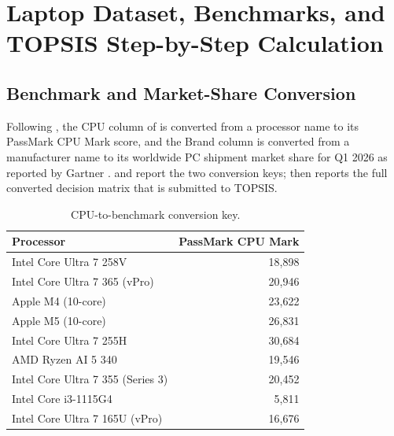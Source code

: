 \chapter{Laptop Dataset, Benchmarks, and TOPSIS Step-by-Step Calculation}\label{app:laptop-data}

\section{Benchmark and Market-Share Conversion}\label{app:laptop-data-conversion}

Following , the CPU column of  is
converted from a processor name to its PassMark CPU Mark score, and the Brand column is
converted from a manufacturer name to its worldwide PC shipment market share for Q1 2026 as
reported by Gartner \parencite{gartner_2026}.  and
 report the two conversion keys; 
then reports the full converted decision matrix that is submitted to TOPSIS.

\begin{table}[htbp]
  \centering
  \caption{CPU-to-benchmark conversion key.}
  \label{tab:cpu-passmark}
  \begin{tabular}{@{}p{7.5cm}r@{}}
    \toprule
    Processor & PassMark CPU Mark \\
    \midrule
    Intel Core Ultra 7 258V & 18{,}898 \\
    Intel Core Ultra 7 365 (vPro) & 20{,}946 \\
    Apple M4 (10-core) & 23{,}622 \\
    Apple M5 (10-core) & 26{,}831 \\
    Intel Core Ultra 7 255H & 30{,}684 \\
    AMD Ryzen AI 5 340 & 19{,}546 \\
    Intel Core Ultra 7 355 (Series 3) & 20{,}452 \\
    Intel Core i3-1115G4 & 5{,}811 \\
    Intel Core Ultra 7 165U (vPro) & 16{,}676 \\
    \bottomrule
  \end{tabular}
\end{table}

